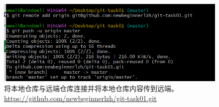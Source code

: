 \documentclass[a4paper, 12pt]{article}
\begin{document}
 \\




\begin{figure}[H]
  \centering
  \includegraphics[width=1\textwidth]{屏幕截图 2024-08-28 164514.png}
  \caption{将本地仓库与远端仓库连接并将本地仓库内容传到远端。\href{https://github.com/newbeginnerlzh/git-task01.git}{\color{red}https://github.com/newbeginnerlzh/git-task01.git}}
    \end{figure}
\\
\end{document}
